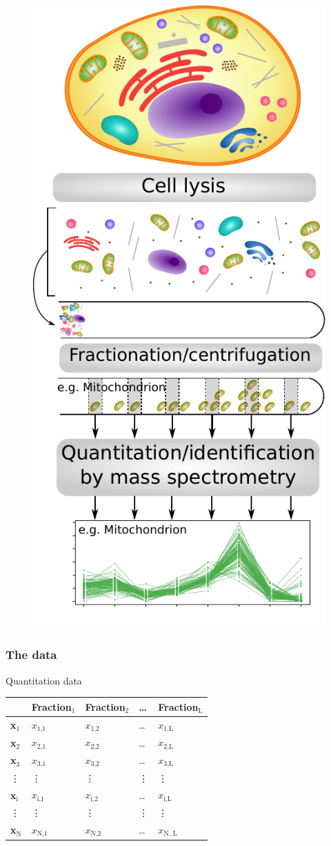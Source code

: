 \begin{frame}{}
  \begin{figure}
    \includegraphics[width=.39\linewidth]{figs_all/workflow_primary.pdf}
  \end{figure}
\end{frame}

\subsubsection*{The data}
\label{sec:data}

\begin{frame}{Quantitation data}
  \begin{center}
    \begin{tabular}{|l|llll|}
      \hline
      & Fraction$_{\text{1}}$ & Fraction$_{\text{2}}$ & \ldots{} & Fraction$_{\text{L}}$ \\
      \hline
      {\bf x}$_{\text{1}}$ & $x_{\text{1,1}}$ & $x_{\text{1,2}}$ & \ldots{} & $x_{\text{1,L}}$ \\
      {\bf x}$_{\text{2}}$ & $x_{\text{2,1}}$ & $x_{\text{2,2}}$ & \ldots{} & $x_{\text{2,L}}$ \\
      {\bf x}$_{\text{3}}$ & $x_{\text{3,1}}$ & $x_{\text{3,2}}$ & \ldots{} & $x_{\text{3,L}}$ \\
      \vdots & \vdots & \vdots & \vdots & \vdots \\
      {\bf x}$_{\text{i}}$ & $x_{\text{i,1}}$ & $x_{\text{i,2}}$ & \ldots{} & $x_{\text{i,L}}$ \\
      \vdots & \vdots & \vdots & \vdots & \vdots \\
      {\bf x}$_{\text{N}}$ & $x_{\text{N,1}}$ & $x_{\text{N,2}}$ & \ldots{} & $x_{\text{N, L}}$ \\
      \hline
    \end{tabular}
  \end{center}
\end{frame}

